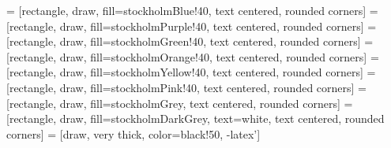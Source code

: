 
 = [rectangle, draw, fill=stockholmBlue!40, text centered, rounded corners]
 = [rectangle, draw, fill=stockholmPurple!40, text centered, rounded corners]
 = [rectangle, draw, fill=stockholmGreen!40, text centered, rounded corners]
 = [rectangle, draw, fill=stockholmOrange!40, text centered, rounded corners]
 = [rectangle, draw, fill=stockholmYellow!40, text centered, rounded corners]
 = [rectangle, draw, fill=stockholmPink!40, text centered, rounded corners]
 = [rectangle, draw, fill=stockholmGrey, text centered, rounded corners]
 = [rectangle, draw, fill=stockholmDarkGrey, text=white, text centered, rounded corners]
 = [draw, very thick, color=black!50, -latex']

								
								
